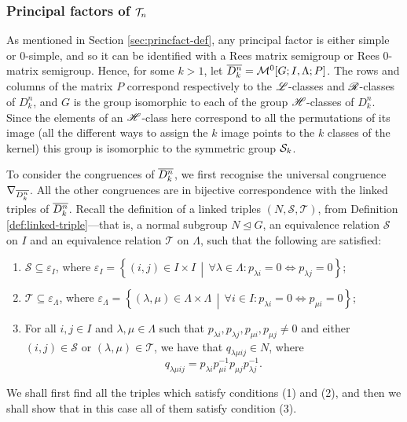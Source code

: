 \subsubsection{Principal factors of $\mathcal{T}_n$}
As mentioned in Section \ref{sec:princfact-def}, any principal factor is either
simple or 0-simple, and so it can be identified with a Rees matrix semigroup or
Rees 0-matrix semigroup.  Hence, for some $k > 1$, let
$\overline{D_k^n} = \mathcal{M}^0[G;I,\Lambda;P]$.  The rows and columns of the matrix
$P$ correspond respectively to the $\mathrel{\mathscr{L}}$-classes and $\mathrel{\mathscr{R}}$-classes of $D_k^n$,
and $G$ is the group isomorphic to each of the group $\mathrel{\mathscr{H}}$-classes of $D_k^n$.
Since the elements of an $\mathrel{\mathscr{H}}$-class here correspond to all the permutations of
its image (all the different ways to assign the $k$ image points to the $k$
classes of the kernel) this group is isomorphic to the symmetric group $\mathcal{S}_k$.

To consider the congruences of $\overline{D_k^n}$, we first recognise the universal
congruence $\nabla_{\overline{D_k^n}}$.  All the other congruences are in bijective
correspondence with the linked triples of $\overline{D_k^n}$.  Recall the definition
of a linked triples $(N,\mathcal{S},\mathcal{T})$, from Definition
\ref{def:linked-triple}---that is, a normal subgroup $N \trianglelefteq G$, an
equivalence relation $\mathcal{S}$ on $I$ and an equivalence relation
$\mathcal{T}$ on $\Lambda$, such that the following are satisfied:
\begin{enumerate}[\rm(1)]
\item $\mathcal{S} \subseteq \varepsilon_I$, where
  $\varepsilon_I = \left\{(i,j) \in I \times I\, \middle|\, \forall \lambda \in
    \Lambda: p_{\lambda i}=0 \iff p_{\lambda j}=0 \right\}$;
\item $\mathcal{T} \subseteq \varepsilon_\Lambda$, where
  $\varepsilon_\Lambda = \left\{(\lambda,\mu) \in \Lambda \times \Lambda\,
    \middle|\, \forall i \in I: p_{\lambda i}=0 \iff p_{\mu i}=0 \right\}$;
\item For all $i,j \in I$ and $\lambda, \mu \in \Lambda$ such that
  $p_{\lambda i}, p_{\lambda j}, p_{\mu i}, p_{\mu j} \neq 0$ and either
  $(i,j) \in \mathcal{S}$ or $(\lambda,\mu) \in \mathcal{T}$, we have that
  $q_{\lambda \mu i j} \in N$, where
  $$q_{\lambda \mu i j} = p_{\lambda i} p_{\mu i}^{-1} p_{\mu j} p_{\lambda
    j}^{-1}.$$
\end{enumerate}
We shall first find all the triples which satisfy conditions (1) and (2), and
then we shall show that in this case all of them satisfy condition (3).

